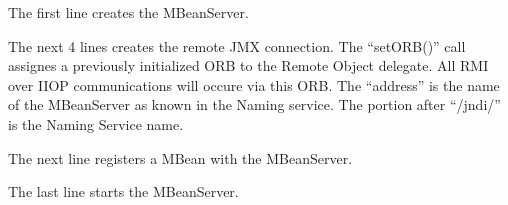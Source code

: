 The first line creates the MBeanServer.

The next 4 lines creates the remote JMX connection. The "`setORB()"' call assignes a previously
initialized ORB to the Remote Object delegate. All RMI over IIOP communications will occure
via this ORB. The "`address"' is the name of the MBeanServer as known in the Naming service.
The portion after "`/jndi/"' is the Naming Service name.

The next line registers a MBean with the MBeanServer.

The last line starts the MBeanServer.

